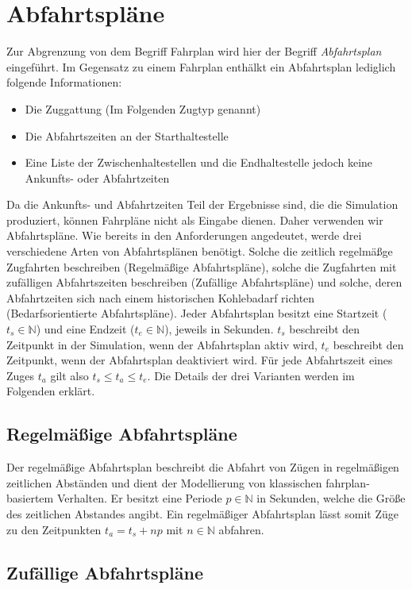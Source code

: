 \section{Abfahrtspläne}

Zur Abgrenzung von dem Begriff Fahrplan wird hier der Begriff \emph{Abfahrtsplan} eingeführt. Im Gegensatz zu einem Fahrplan enthälkt ein Abfahrtsplan lediglich folgende Informationen:
\begin{itemize}
    \item Die Zuggattung (Im Folgenden Zugtyp genannt)
    \item Die Abfahrtszeiten an der Starthaltestelle
    \item Eine Liste der Zwischenhaltestellen und die Endhaltestelle jedoch keine Ankunfts- oder Abfahrtzeiten
\end{itemize}
Da die Ankunfts- und Abfahrtzeiten Teil der Ergebnisse sind, die die Simulation produziert, können Fahrpläne nicht als Eingabe dienen. Daher verwenden wir Abfahrtspläne. Wie bereits in den Anforderungen angedeutet, werde drei verschiedene Arten von Abfahrtsplänen benötigt. Solche die zeitlich regelmäßge Zugfahrten beschreiben (Regelmäßige Abfahrtspläne), solche die Zugfahrten mit zufälligen Abfahrtszeiten beschreiben (Zufällige Abfahrtspläne) und solche, deren Abfahrtzeiten sich nach einem historischen Kohlebadarf richten (Bedarfsorientierte Abfahrtspläne). Jeder Abfahrtsplan besitzt eine Startzeit ($t_s \in \mathbb{N}$) und eine Endzeit ($t_e \in \mathbb{N}$), jeweils in Sekunden. $t_s$ beschreibt den Zeitpunkt in der Simulation, wenn der Abfahrtsplan aktiv wird, $t_e$ beschreibt den Zeitpunkt, wenn der Abfahrtsplan deaktiviert wird. Für jede Abfahrtszeit eines Zuges $t_a$ gilt also $t_s\leq t_a \leq t_e$. Die Details der drei Varianten werden im Folgenden erklärt.

\subsection{Regelmäßige Abfahrtspläne}

Der regelmäßige Abfahrtsplan beschreibt die Abfahrt von Zügen in regelmäßigen zeitlichen Abständen und dient der Modellierung von klassischen fahrplan-basiertem Verhalten. Er besitzt eine Periode $p\in\mathbb{N}$ in Sekunden, welche die Größe des zeitlichen Abstandes angibt. Ein regelmäßiger Abfahrtsplan lässt somit Züge zu den Zeitpunkten $t_a=t_s+np$ mit $n\in\mathbb{N}$ abfahren.

\subsection{Zufällige Abfahrtspläne}

